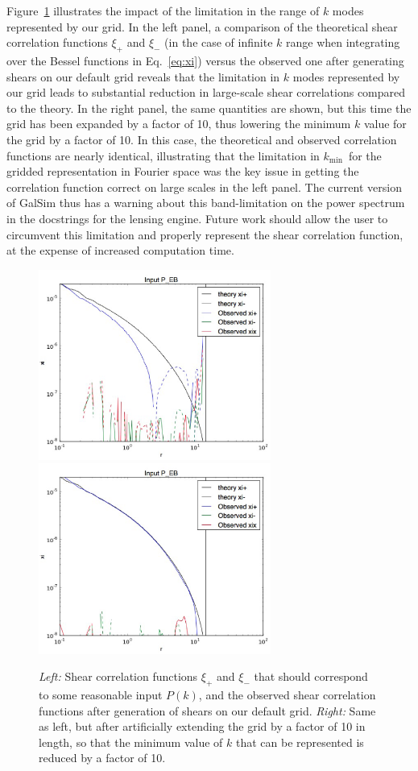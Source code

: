 \documentclass[preprint]{aastex}
\newcommand{\kmin}{\ensuremath{k_\mathrm{min}}}
\begin{document}
Figure~\ref{F:cf} illustrates the impact of the limitation in the
range of $k$ modes represented by our grid.  In the left panel, a
comparison of the theoretical shear correlation functions $\xi_+$ and
$\xi_-$ (in the case of infinite $k$ range when integrating over the
Bessel functions in Eq.~\ref{eq:xi}) versus the observed one after
generating shears on our default grid reveals that the limitation in
$k$ modes represented by our grid leads to substantial reduction in
large-scale shear correlations compared to the theory.  In the right
panel, the same quantities are shown, but this time the grid has been
expanded by a factor of 10, thus lowering the minimum $k$ value for
the grid by a factor of 10.  In this case, the theoretical and
observed correlation functions are nearly identical, illustrating that
the limitation in \kmin\ for the gridded representation in Fourier
space was the key issue in getting the correlation function correct on
large scales in the left panel.  The current version of GalSim thus
has a warning about this band-limitation on the power spectrum in the
docstrings for the lensing engine.  Future work should allow the user
to circumvent this limitation and properly represent the shear
correlation function, at the expense of increased computation time.
\begin{figure}
\begin{center}
\includegraphics[width=3in]{cf.eps}
\includegraphics[width=3in]{cf10.eps}
\caption{{\em Left:} Shear correlation functions $\xi_+$ and $\xi_-$
  that should correspond to some reasonable input $P(k)$, and the
  observed shear correlation functions after generation of shears on
  our default grid. {\em Right:} Same as left, but after artificially
  extending the grid by a factor of 10 in length, so that the minimum
  value of $k$ that can be represented is reduced by a factor of
  10.\label{F:cf}}
\end{center}
\end{figure}
\end{document}
